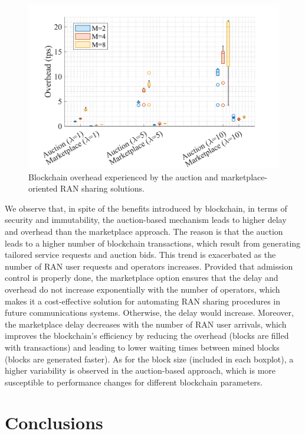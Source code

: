 \documentclass[journal]{IEEEtran}
\begin{document}
	\begin{figure}[ht!]
		\centering
		\includegraphics[width=.85\linewidth]{overhead_new.png}
		\caption{Blockchain overhead experienced by the auction and marketplace-oriented RAN sharing solutions.}
		\label{fig:overhead}
	\end{figure}
	
	We observe that, in spite of the benefits introduced by blockchain, in terms of security and immutability, the auction-based mechanism leads to higher delay and overhead than the marketplace approach. The reason is that the auction leads to a higher number of blockchain transactions, which result from generating tailored service requests and auction bids. This trend is exacerbated as the number of RAN user requests and operators increases. Provided that admission control is properly done, the marketplace option ensures that the delay and overhead do not increase exponentially with the number of operators, which makes it a cost-effective solution for automating RAN sharing procedures in future communications systems. Otherwise, the delay would increase. Moreover, the marketplace delay decreases with the number of RAN user arrivals, which improves the blockchain's efficiency by reducing the overhead (blocks are filled with transactions) and leading to lower waiting times between mined blocks (blocks are generated faster). As for the block size (included in each boxplot), a higher variability is observed in the auction-based approach, which is more susceptible to performance changes for different blockchain parameters.
	
	\section{Conclusions}
	\label{section:conclusions}
	
\end{document}
